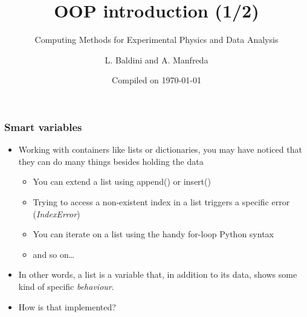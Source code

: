 \documentclass[9pt]{beamer}
\title{OOP introduction (1/2)}
\subtitle{Computing Methods for Experimental Physics and Data Analysis}
\date{Compiled on \today}
\author{L. Baldini and A. Manfreda}
\institute[INFN]{INFN--Pisa}
\begin{document}
\titleframe


\begin{frame}
  \frametitle{Smart variables}

  \begin{itemize}
    \item Working with containers like lists or dictionaries, you may have noticed
          that they can do many things besides holding the data
    \medskip
    \begin{itemize}
      \item You can extend a list using append() or insert()
      \item Trying to access a non-existent index in a list triggers a specific error (\emph{IndexError})
      \item You can iterate on a list using the handy for-loop Python syntax
      \item and so on\dots
     \end{itemize}
     \medskip
     \item In other words, a list is a variable that, in addition to its data,
           shows some kind of specific \emph{behaviour}.
     \medskip
     \item How is that implemented?
  \end{itemize}
\end{frame}
\end{document}
